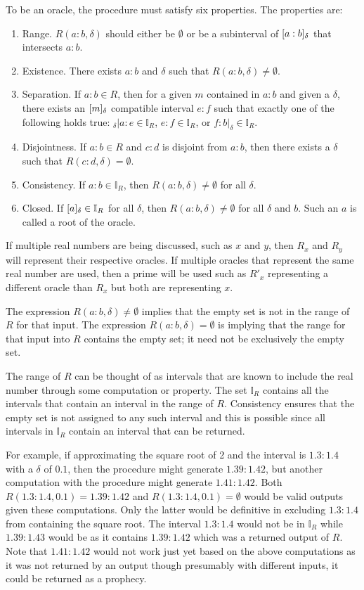 \documentclass[12pt]{article}
\begin{document}
To be an oracle, the procedure must satisfy six properties.  The properties are:
\begin{enumerate}
    \item Range. 
    $R(a:b, \delta)$ should either be $\emptyset$ or be a subinterval of $[a:b]_{\delta}$ that intersects $a:b$. 
    \item Existence. 
    There exists $a:b$ and $\delta$ such that $R(a:b, \delta) \neq \emptyset$.
    \item Separation. 
    If $a:b \in R$, then for a given $m$ contained in $a:b$ and given a $\delta$, there exists an $[m]_{\delta}$ compatible interval $e:f$ such that exactly one of the following holds true:  ${}_\delta |a:e \in \mathbb{I}_R$, $e:f \in \mathbb{I}_R$,  or $f:b|_\delta \in \mathbb{I}_R$.
   \item Disjointness. 
   If $a:b \in R$ and $c:d$ is disjoint from $a:b$, then there exists a $\delta$ such that $R(c:d, \delta) = \emptyset$.
    \item Consistency. 
    If $a:b  \in \mathbb{I}_R$, then $R(a:b, \delta) \neq \emptyset$ for all $\delta$.
    \item Closed. 
    If $[a]_{\delta} \in \mathbb{I}_R$ for all $\delta $, then $R(a:b, \delta) \neq \emptyset$ for all $\delta$ and $b$. Such an $a$ is called a root of the oracle. 
\end{enumerate}

If multiple real numbers are being discussed, such as $x$ and $y$, then $R_x$ and $R_y$ will represent their respective oracles. If multiple oracles that represent the same real number are used, then a prime will be used such as $R'_x$ representing a different oracle than $R_x$ but both are representing $x$. 

The expression $R(a:b, \delta) \neq \emptyset$ implies that the empty set is not in the range of $R$ for that input. The expression $R(a:b, \delta) = \emptyset$ is implying that the range for that input into $R$ contains the empty set; it need not be exclusively the empty set.

The range of $R$ can be thought of as intervals that are known to include the real number through some computation or property. The set $\mathbb{I}_R$ contains all the intervals that contain an interval in the range of $R$. Consistency ensures that the empty set is not assigned to any such interval and this is possible since all intervals in $\mathbb{I}_R$ contain an interval that can be returned. 

 For example, if approximating the square root of 2 and the interval is $1.3:1.4$ with a $\delta$ of $0.1$, then the procedure might generate $1.39:1.42$, but another computation with the procedure might generate $1.41:1.42$. Both $R(1.3:1.4, 0.1) = 1.39:1.42$ and $R(1.3:1.4, 0.1) = \emptyset$ would be valid outputs given these computations. Only the latter would be definitive in excluding $1.3:1.4$ from containing the square root. The interval $1.3:1.4$ would not be in $\mathbb{I}_R$ while $1.39:1.43$ would be as it contains $1.39:1.42$ which was a returned output of $R$. Note that $1.41:1.42$ would not work just yet based on the above computations as it was not returned by an output though presumably with different inputs, it could be returned as a prophecy. 
\end{document}
